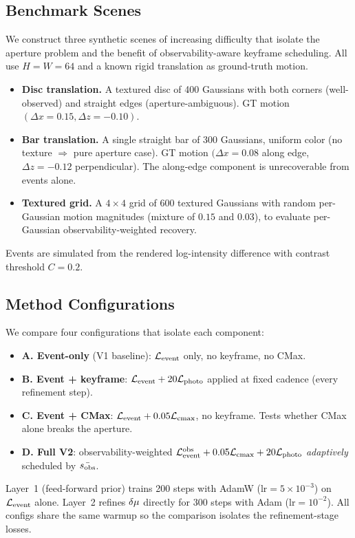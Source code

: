 \subsection{Benchmark Scenes}
We construct three synthetic scenes of increasing difficulty that isolate the aperture problem and the benefit of observability-aware keyframe scheduling. All use $H{=}W{=}64$ and a known rigid translation as ground-truth motion.
\begin{itemize}[leftmargin=*,topsep=2pt,itemsep=1pt]
  \item \textbf{Disc translation.} A textured disc of 400 Gaussians with both corners (well-observed) and straight edges (aperture-ambiguous). GT motion $(\Delta x{=}0.15, \Delta z{=}{-}0.10)$.
  \item \textbf{Bar translation.} A single straight bar of 300 Gaussians, uniform color (no texture $\Rightarrow$ pure aperture case). GT motion $(\Delta x{=}0.08$ along edge, $\Delta z{=}{-}0.12$ perpendicular). The along-edge component is unrecoverable from events alone.
  \item \textbf{Textured grid.} A $4{\times}4$ grid of 600 textured Gaussians with random per-Gaussian motion magnitudes (mixture of $0.15$ and $0.03$), to evaluate per-Gaussian observability-weighted recovery.
\end{itemize}
Events are simulated from the rendered log-intensity difference with contrast threshold $C{=}0.2$.

\subsection{Method Configurations}
We compare four configurations that isolate each component:
\begin{itemize}[leftmargin=*,topsep=2pt,itemsep=1pt]
  \item \textbf{A. Event-only} (V1 baseline): $\mathcal{L}_{\text{event}}$ only, no keyframe, no CMax.
  \item \textbf{B. Event + keyframe}: $\mathcal{L}_{\text{event}} + 20\mathcal{L}_{\text{photo}}$ applied at fixed cadence (every refinement step).
  \item \textbf{C. Event + CMax}: $\mathcal{L}_{\text{event}} + 0.05\mathcal{L}_{\text{cmax}}$, no keyframe. Tests whether CMax alone breaks the aperture.
  \item \textbf{D. Full V2}: observability-weighted $\mathcal{L}_{\text{event}}^{\text{obs}} + 0.05\mathcal{L}_{\text{cmax}} + 20\mathcal{L}_{\text{photo}}$ \emph{adaptively} scheduled by $\bar{s_{\mathrm{obs}}}$.
\end{itemize}
Layer~1 (feed-forward prior) trains 200 steps with AdamW ($\text{lr}{=}5{\times}10^{-3}$) on $\mathcal{L}_{\text{event}}$ alone. Layer~2 refines $\delta\mu$ directly for 300 steps with Adam ($\text{lr}{=}10^{-2}$). All configs share the same warmup so the comparison isolates the refinement-stage losses.

